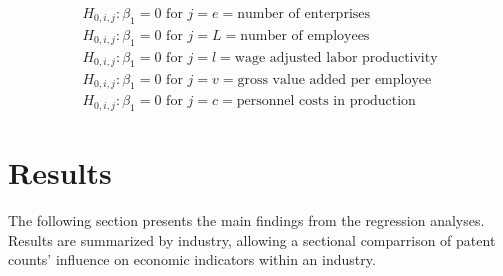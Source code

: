 \documentclass[
  11,
  a4paperpaper,
]{article}
\let\oldsection\section
\renewcommand\section{\clearpage\oldsection}
\begin{document}
\begin{align}
H_{0, i, j}: \beta_1 = 0\text{ for }j=e=\text{number of enterprises} \\
H_{0, i, j}: \beta_1 = 0\text{ for }j=L=\text{number of employees} \\
H_{0, i, j}: \beta_1 = 0\text{ for }j=l=\text{wage adjusted labor productivity} \\
H_{0, i, j}: \beta_1 = 0\text{ for }j=v=\text{gross value added per employee} \\
H_{0, i, j}: \beta_1 = 0\text{ for }j=c=\text{personnel costs in production}
\end{align}

\section{Results}\label{sec-results}

The following section presents the main findings from the regression
analyses. Results are summarized by industry, allowing a sectional
comparrison of patent counts' influence on economic indicators within an
industry.

\end{document}
